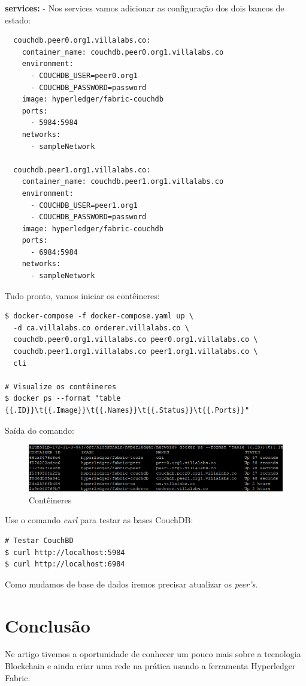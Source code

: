 \documentclass[a4paper,11pt]{article}
\begin{document}
\textbf{services:} - Nos services vamos adicionar as configuração dos dois bancos de estado:
\begin{lstlisting}
  couchdb.peer0.org1.villalabs.co:
    container_name: couchdb.peer0.org1.villalabs.co
    environment:
      - COUCHDB_USER=peer0.org1
      - COUCHDB_PASSWORD=password
    image: hyperledger/fabric-couchdb
    ports: 
      - 5984:5984
    networks: 
      - sampleNetwork

  couchdb.peer1.org1.villalabs.co:
    container_name: couchdb.peer1.org1.villalabs.co
    environment:
      - COUCHDB_USER=peer1.org1
      - COUCHDB_PASSWORD=password
    image: hyperledger/fabric-couchdb
    ports: 
      - 6984:5984
    networks: 
      - sampleNetwork
\end{lstlisting}

Tudo pronto, vamos iniciar os contêineres:
\begin{lstlisting}
$ docker-compose -f docker-compose.yaml up \
  -d ca.villalabs.co orderer.villalabs.co \
  couchdb.peer0.org1.villalabs.co peer0.org1.villalabs.co \
  couchdb.peer1.org1.villalabs.co peer1.org1.villalabs.co \
  cli

# Visualize os contêineres
$ docker ps --format "table {{.ID}}\t{{.Image}}\t{{.Names}}\t{{.Status}}\t{{.Ports}}"
\end{lstlisting}

Saída do comando:
\begin{figure}[H]
  \centering
  \includegraphics[width=1.1\textwidth]{imagens/conteineres-3.png}
  \caption{Contêineres}
\end{figure}

Use o comando \textit{curl} para testar as bases CouchDB:
\begin{lstlisting}
# Testar CouchBD
$ curl http://localhost:5984
$ curl http://localhost:6984
\end{lstlisting}

Como mudamos de base de dados iremos precisar atualizar os \textit{peer's}.

\section{Conclusão}
Ne artigo tivemos a oportunidade de conhecer um pouco mais sobre a tecnologia Blockchain e ainda criar uma rede na prática usando a ferramenta Hyperledger\cite{hyperledger} Fabric\cite{hyperledgerfabric}. 
\end{document}
